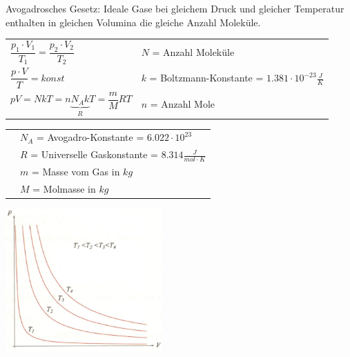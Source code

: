 		\begin{minipage}{13cm}
			\begin{flushleft}
				Avogadrosches Gesetz: Ideale Gase bei gleichem Druck und gleicher Temperatur enthalten in gleichen Volumina die gleiche Anzahl Moleküle.
			\end{flushleft}
			\renewcommand{\arraystretch}{2.5}
			\begin{tabular}{ p{5cm} | p{7cm}}
				$\dfrac{p_1 \cdot V_1}{T_1} = \dfrac{p_2 \cdot V_2}{T_2}$ &	$N$ = Anzahl Moleküle\\
				$\dfrac{p \cdot V}{T} = konst$ & $k$ = Boltzmann-Konstante = $1.381 \cdot 10^{-23} \frac{J}{K}$\\
				$pV = N k T = n \underbrace{N_A k}_R T = \dfrac{m}{M} R T$	& $n$ = Anzahl Mole\\
			\end{tabular}
			\renewcommand{\arraystretch}{1.5}
			\begin{tabular}{ p{5cm} | p{7cm} }
				& $N_A$ = Avogadro-Konstante = $6.022 \cdot 10^{23}$\\
				& $R$ = Universelle Gaskonstante = $8.314 \frac{J}{mol \cdot K}$\\
				& $m$ = Masse vom Gas in $kg$\\
				& $M$ = Molmasse in $kg$\\
			\end{tabular} 
			\renewcommand{\arraystretch}{1}
		\end{minipage}
		\begin{minipage}{10cm}
			\vspace{-\ht\strutbox}\includegraphics[width=6cm]{./bilder/Isotherme.png}
		\end{minipage}
		\newline
